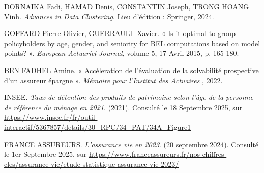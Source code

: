 \newpage %


\begin{thebibliography}{9}



DORNAIKA Fadi, HAMAD Denis, CONSTANTIN Joseph, TRONG HOANG Vinh. \textit{Advances in Data Clustering}. Lieu d'édition : Springer, 2024.

GOFFARD Pierre-Olivier, GUERRAULT Xavier. « Is it optimal to group policyholders by age, gender, and seniority for BEL computations based on model points? ». \textit{European Actuariel Journal}, volume 5, 17 Avril 2015, p. 165-180.


BEN FADHEL Amine. « Accéleration de l'évaluation de la solvabilité prospective d'un assureur épargne ». \textit{Mémoire pour l'Institut des Actuaires }, 2022.

INSEE. \textit{Taux de détention des produits de patrimoine selon l'âge de la personne de référence du ménage en 2021}. (2021). Consulté le 18 Septembre 2025, sur \url{https://www.insee.fr/fr/outil-interactif/5367857/details/30_RPC/34_PAT/34A_Figure1}

FRANCE ASSUREURS. \textit{L'assurance vie en 2023}. (20 septembre 2024). Consulté le 1er Septembre 2025, sur \url{https://www.franceassureurs.fr/nos-chiffres-cles/assurance-vie/etude-statistique-assurance-vie-2023/}


\end{thebibliography}